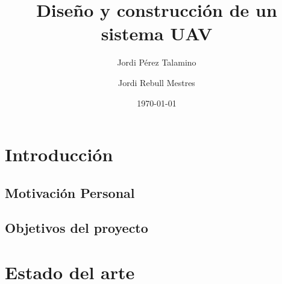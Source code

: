 \documentclass[12pt,twoside]{article}
\title{Diseño y construcción de un sistema UAV}
\author{Jordi Pérez Talamino \and Jordi Rebull Mestres}
\date{\today}
\begin{document}
\pagestyle{fancy}

\fancyhead{}

\fancyhead[RO,LE]{\thepage}

\fancyfoot{}
\maketitle

\newpage

\tableofcontents

\newpage
	
  \section{Introducción}\label{sec:intro}
	
		\subsection{Motivación Personal}\label{subsec:motiva}
		
		\subsection{Objetivos del proyecto}\label{subsec:objectivos}
		
\newpage

 \section{Estado del arte}\label{sec:estado arte}
\end{document}
